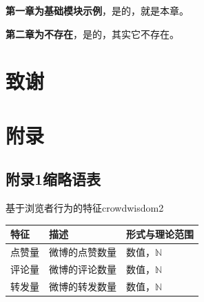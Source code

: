 \documentclass[a4paper,AutoFakeBold,oneside,12pt]{book}
\begin{document}
\begin{description}
\item \textbf{第一章为基础模块示例}，是的，就是本章。
\item \textbf{第二章为不存在}，是的，其实它不存在。
\end{description}

\clearpage{}


\clearpage{}
\chapter*{致\qquad{}谢}
\normalsize\thankwords

\setcounter{figure}{0} 
\renewcommand{\thefigure}{~附-\arabic{figure}~}
\setcounter{equation}{0} 
\renewcommand{\theequation}{~附-\arabic{equation}~}
\setcounter{table}{0} 
\renewcommand{\thetable}{~附-\arabic{table}~}

\chapter*{附\qquad{}录}

{}
\section*{附录1\quad{}缩略语表}

\begin{bupttable}{基于浏览者行为的特征}{crowdwisdom2}
    \begin{tabular}{l|l|l}
        \hline \textbf{特征} & \textbf{描述} & \textbf{形式与理论范围}\\
        \hline 点赞量 & 微博的点赞数量 & 数值，$\mathbb{N}$ \\
        \hline 评论量 & 微博的评论数量 & 数值，$\mathbb{N}$ \\
        \hline 转发量 & 微博的转发数量 & 数值，$\mathbb{N}$ \\
        \hline
    \end{tabular}
\end{bupttable}
\end{document}
